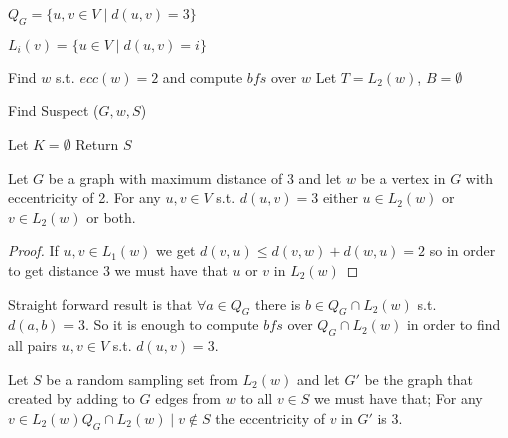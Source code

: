 
\begin{definition}
$Q_G=\{u,v\in V\mid d(u,v)=3 \}$
\end{definition}
\begin{definition}
$L_i(v)=\{u \in V\mid d(u,v)=i \}$
\end{definition}



\LinesNumbered
\begin{algorithm}[ht]
  \caption{\label{alg}}
  Find $w$ s.t. $ecc(w)=2$ and compute $bfs$ over $w$\;
  Let $T=L_2(w)$, $B=\emptyset$\;
\end{algorithm}

\LinesNumbered
\begin{algorithm}[ht]
  \caption{Find Suspect ({$G,w,S$})\label{alg}}
     Let $K=\emptyset$\;
   Return $S$\;
\end{algorithm}

\begin{theorem}
Let $G$ be a graph with maximum distance of $3$ and let $w$ be a vertex in $G$ with eccentricity of 2. For any $u,v \in V$ s.t. $d(u,v)=3$  either $u \in L_2(w)$ or $v \in L_2(w)$ or both.
\end{theorem}
\begin{proof}
If $u,v \in L_1(w)$ we get $d(v,u)\leq d(v,w)+d(w,u)=2$ so in order to get distance $3$ we must have that $u$ or $v$ in $L_2(w)$
\end{proof}

Straight forward result is that $\forall a \in Q_G$ there is $b \in Q_G\cap L_2(w)$ s.t. $d(a,b)=3$. So it is enough to compute $bfs$ over $Q_G\cap L_2(w)$ in order to find all pairs $u,v \in V$ s.t. $d(u,v)=3$.

\begin{theorem}
Let $S$ be a random sampling set from $L_2(w)$ and let
$G'$  be the graph that created by adding to $G$ edges from $w$ to all $v \in S$ we must have that; For any $v\in L_2(w) Q_G\cap L_2(w) \mid v \not \in S$ the eccentricity of $v$ in $G'$ is $3$.
\end{theorem}

